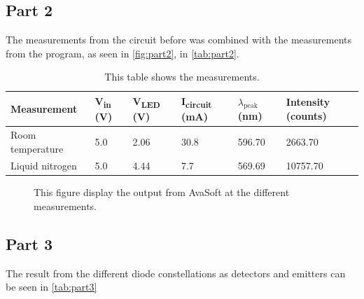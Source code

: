 \subsection{Part 2}
The measurements from the circuit before was combined with the measurements from the program, as seen in \autoref{fig:part2}, in \autoref{tab:part2}.

\begin{table}[H]
    \centering
    \caption{This table shows the measurements.}
    \begin{tabular}{@{}llllll@{}}
    \toprule
    Measurement      & V\textsubscript{in} (V) & V\textsubscript{LED} (V) & I\textsubscript{circuit} (mA) & $\lambda_\text{peak}$ (nm) & Intensity (counts) \\ \midrule
    Room temperature & 5.0& 2.06& 30.8& 596.70& 2663.70\\
    Liquid nitrogen  & 5.0& 4.44                     & 7.7& 569.69& 10757.70\\ \bottomrule
    \end{tabular}
    \label{tab:part2}
    \end{table}


\begin{figure}[H]
    \centering
    \hfill
    \caption{This figure display the output from AvaSoft at the different measurements.}
    \label{fig:part2}
\end{figure}




\subsection{Part 3}
The result from the different diode constellations as detectors and emitters can be seen in \autoref{tab:part3} 

